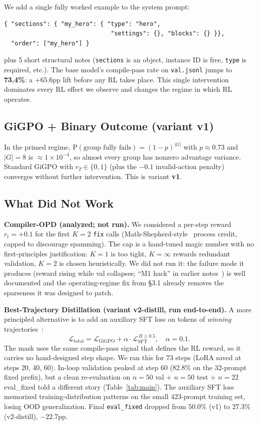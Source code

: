 \documentclass[10pt]{article}
\begin{document}
We add a single fully worked example to the system prompt:

\begin{verbatim}
{ "sections": { "my_hero": { "type": "hero",
                              "settings": {}, "blocks": {} }},
  "order": ["my_hero"] }
\end{verbatim}
plus 5 short structural notes (\texttt{sections} is an object, instance ID is
free, \texttt{type} is required, etc.). The base model's compile-pass rate
on \texttt{val.jsonl} jumps to \textbf{73.4\%}: a $+65.6$pp lift before any
RL takes place. This single intervention dominates every RL effect we
observe and changes the regime in which RL operates.

\subsection{GiGPO + Binary Outcome (variant v1)}

In the primed regime, $\mathrm{P}(\text{group fully fails}) = (1-p)^{|G|}$
with $p \approx 0.73$ and $|G|=8$ is $\approx 1\!\times\!10^{-4}$, so almost
every group has nonzero advantage variance. Standard GiGPO with $r_T \in \{0, 1\}$
(plus the $-0.1$ invalid-action penalty) converges without further
intervention. This is variant \textbf{v1}.

\subsection{What Did Not Work}

\textbf{Compiler-OPD (analyzed; not run).}
We considered a per-step reward $r_t = +0.1$ for the first $K=2$
\texttt{fix} calls (Math-Shepherd-style~\cite{wang2024mathshepherd}
process credit, capped to discourage spamming). The cap is a
hand-tuned magic number with no first-principles justification: $K=1$
is too tight, $K=\infty$ rewards redundant validation, $K=2$ is
chosen heuristically. We did not run it: the failure mode it produces
(reward rising while val collapses; ``M1 hack'' in earlier
notes~\cite{wang2024mathshepherd}) is well documented and the
operating-regime fix from \S3.1 already removes the sparseness it was
designed to patch.

\textbf{Best-Trajectory Distillation (variant v2-distill, run end-to-end).}
A more principled alternative is to add an auxiliary SFT loss on tokens
of \emph{winning} trajectories~\cite{lambert2025tulu3}:
\[
\mathcal{L}_{\mathrm{total}} = \mathcal{L}_{\mathrm{GiGPO}}
+ \alpha \cdot \mathcal{L}_{\mathrm{SFT}}^{\,R \ge 0.5},
\quad \alpha = 0.1.
\]
The mask uses the same compile-pass signal that defines the RL reward,
so it carries no hand-designed step shape. We ran this for 73 steps
(LoRA saved at steps 20, 40, 60). In-loop validation peaked at step 60
(82.8\% on the 32-prompt fixed prefix), but a clean re-evaluation on
$n=50$ val + $n=50$ test + $n=22$ eval\_fixed told a different story
(Table~\ref{tab:main}). The auxiliary SFT loss memorized
training-distribution patterns on the small 423-prompt training set,
losing OOD generalization. Final \texttt{eval\_fixed} dropped from
$50.0\%$ (v1) to $27.3\%$ (v2-distill), $-22.7$pp.
\end{document}
